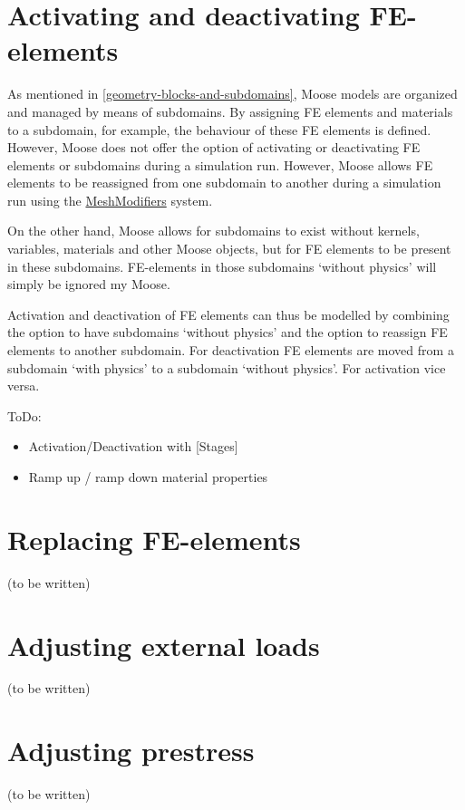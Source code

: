 \section{Activating and deactivating FE-elements}
\label{chap:stages-element-activation-deactivation}

As mentioned in \autoref{geometry-blocks-and-subdomains}, Moose models are
organized and managed by means of subdomains. By assigning FE elements and
materials to a subdomain, for example, the behaviour of these FE elements is
defined. However, Moose does not offer the option of activating or deactivating
FE elements or subdomains during a simulation run. However, Moose allows FE
elements to be reassigned from one subdomain to another during a simulation run
using the
\href{https://mooseframework.inl.gov/syntax/MeshModifiers/index.html}{MeshModifiers}
system.

On the other hand, Moose allows for subdomains to exist without kernels,
variables, materials and other Moose objects, but for FE elements to be present
in these subdomains. FE-elements in those subdomains ‘without physics’ will
simply be ignored my Moose.

Activation and deactivation of FE elements can thus be modelled by combining
the option to have subdomains ‘without physics’ and the option to reassign FE
elements to another subdomain. For deactivation FE elements are moved from a
subdomain ‘with physics’ to a subdomain ‘without physics’. For activation vice
versa.

ToDo:
\begin{itemize}
      \item Activation/Deactivation with [Stages]
      \item Ramp up / ramp down material properties
\end{itemize}

\section{Replacing FE-elements}
\label{chap:stages-element-replacement}

(to be written)

\section{Adjusting external loads}
\label{chap:stages-loads}

(to be written)

\section{Adjusting prestress}
\label{chap:stages-prestress}

(to be written)